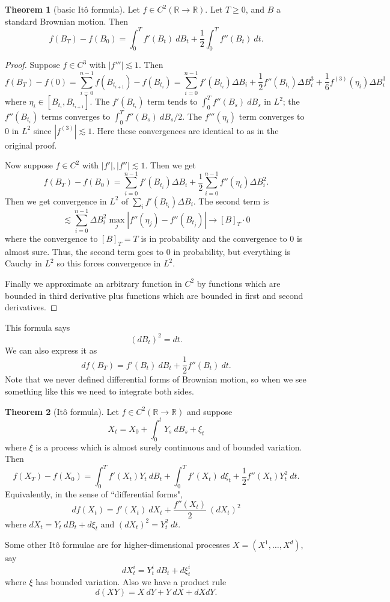 \documentclass[12pt]{book}
\newcommand{\RR}{\mathbb{R}}
\theoremstyle{definition}
\newtheorem{theorem}{Theorem}[chapter]
\begin{document}
\begin{theorem}[basic It\^o formula]
Let $f \in C^2(\RR \to \RR)$.
Let $T \geq 0$, and $B$ a standard Brownian motion. Then
$$f(B_T) - f(B_0) = \int_0^T f'(B_t) ~dB_t + \frac{1}{2}\int_0^T f''(B_t) ~dt.$$
\end{theorem}
\begin{proof}
Suppose $f \in C^3$ with $|f'''| \lesssim 1$. Then
$$f(B_T) - f(0) = \sum_{i=0}^{n-1} f(B_{t_{i+1}}) - f(B_{t_i}) = \sum_{i=0}^{n-1} f'(B_{t_i})\Delta B_i + \frac{1}{2} f''(B_{t_i}) \Delta B_i^3 + \frac{1}{6} f^{(3)}(\eta_i) \Delta B_i^3$$
where $\eta_i \in [B_{t_i}, B_{t_{i+1}}]$.
The $f'(B_{t_i})$ term tends to $\int_0^T f''(B_s) ~dB_s$ in $L^2$; the $f''(B_{t_i})$ terms converges to $\int_0^T f''(B_s) ~dB_s/2$.
The $f'''(\eta_i)$ term converges to $0$ in $L^2$ since $|f^{(3)}| \lesssim 1$.
Here these convergences are identical to as in the original proof.

Now suppose $f \in C^2$ with $|f'|,|f''| \lesssim 1$.
Then we get
$$f(B_T) - f(B_0) = \sum_{i=0}^{n-1} f'(B_{t_i}) \Delta B_i + \frac{1}{2} \sum_{i=0}^{n-1} f''(\eta_i) \Delta B_i^2.$$
Then we get convergence in $L^2$ of $\sum_i f'(B_{t_i})\Delta B_i$.
The second term is
$$\lesssim \sum_{i=0}^{n-1} \Delta B_i^2 \max_j |f''(\eta_j) - f''(B_{t_j})| \to [B]_T \cdot 0$$
where the convergence to $[B]_T = T$ is in probability and the convergence to $0$ is almost sure.
Thus, the second term goes to $0$ in probability, but everything is Cauchy in $L^2$ so this forces convergence in $L^2$.

Finally we approximate an arbitrary function in $C^2$ by functions which are bounded in third derivative plus functions which are bounded in first and second derivatives.
\end{proof}

This formula says
$$(dB_t)^2 = dt.$$
We can also express it as
$$df(B_T) = f'(B_t) ~dB_t + \frac{1}{2} f''(B_t) ~dt.$$
Note that we never defined differential forms of Brownian motion, so when we see something like this we need to integrate both sides.

\begin{theorem}[It\^o formula]
Let $f \in C^2(\RR \to \RR)$ and suppose
$$X_t = X_0 + \int_0^t Y_s ~dB_s + \xi_t$$
where $\xi$ is a process which is almost surely continuous and of bounded variation.
Then
$$f(X_T) - f(X_0) = \int_0^T f'(X_t) Y_t ~dB_t + \int_0^T f'(X_t) ~d\xi_t + \frac{1}{2} f''(X_t) Y_t^2 ~dt.$$
Equivalently, in the sense of ``differential forms",
$$df(X_t) = f'(X_t) ~dX_t + \frac{f''(X_t)}{2} ~(dX_t)^2$$
where $dX_t = Y_t ~dB_t + d\xi_t$ and $(dX_t)^2 = Y_t^2 ~dt$.
\end{theorem}

Some other It\^o formulae are for higher-dimensional processes $X = (X^1, \dots, X^d)$, say
$$dX_t^i = Y^i_t ~dB_t + d\xi_t^i$$
where $\xi$ has bounded variation.
Also we have a product rule
$$d(XY) = X~dY + Y~dX + dXdY.$$






\newpage
\printindex
\printbibliography
\end{document}
